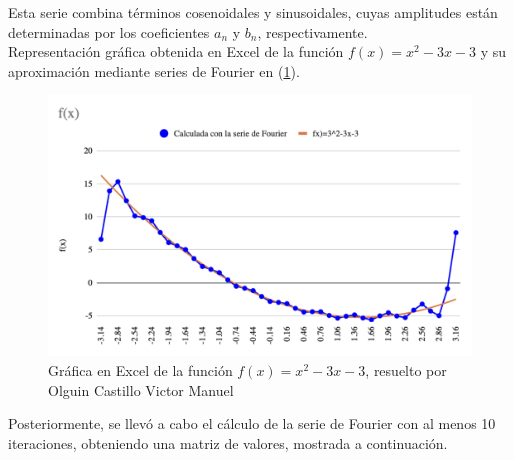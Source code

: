 {Esta serie combina términos cosenoidales y sinusoidales, cuyas amplitudes están determinadas por los coeficientes \( a_n \) y \( b_n \), respectivamente.
\\ 

Representación gráfica obtenida en Excel de la función \(f(x) = x^2 - 3x - 3\) y su aproximación mediante series de Fourier en (\ref{fig:figure-manuel-04}). 

\begin{figure}[H]
    \centering
    \includegraphics[width=\linewidth]{Figures/fourierManuel/graficaExcel-Manuel.png}
    \caption[Gráfica en Excel de la función \(f(x)=x^2 - 3x - 3\)]{Gráfica en Excel de la función  \(f(x)=x^2 - 3x - 3\), resuelto por Olguin Castillo Victor Manuel}  %
    \label{fig:figure-manuel-04}
\end{figure}
Posteriormente, se llevó a cabo el cálculo de la serie de Fourier con al menos 10 iteraciones, obteniendo una matriz de valores, mostrada a continuación.
\newpage
\begin{table}[H]
\centering
\caption{Aproximación de \( f(x) = x^2 - 3x -3\) mediante la serie de Fourier}
\end{table}}
